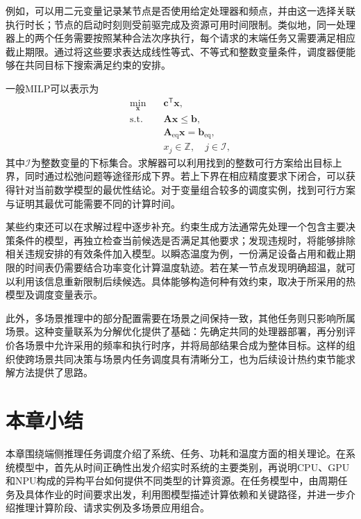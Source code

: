 例如，可以用二元变量记录某节点是否使用给定处理器和频点，并由这一选择关联执行时长；节点的启动时刻则受前驱完成及资源可用时间限制。类似地，同一处理器上的两个任务需要按照某种合法次序执行，每个请求的末端任务又需要满足相应截止期限。通过将这些要求表达成线性等式、不等式和整数变量条件，调度器便能够在共同目标下搜索满足约束的安排。

一般MILP可以表示为
\begin{equation}\label{eq:ch2-milp}
 \begin{aligned}
  \min_{\boldsymbol x}\quad &\boldsymbol c^{\mathsf T}\boldsymbol x,\\
  \text{s.t.}\quad &\boldsymbol A\boldsymbol x\le\boldsymbol b,\\
  &\boldsymbol A_{\mathrm{eq}}\boldsymbol x=\boldsymbol b_{\mathrm{eq}},\\
  &x_j\in\mathbb Z,\quad j\in\mathcal I,
 \end{aligned}
\end{equation}
其中$\mathcal I$为整数变量的下标集合。求解器可以利用找到的整数可行方案给出目标上界，同时通过松弛问题等途径形成下界。若上下界在相应精度要求下闭合，可以获得针对当前数学模型的最优性结论。对于变量组合较多的调度实例，找到可行方案与证明其最优可能需要不同的计算时间。

某些约束还可以在求解过程中逐步补充。约束生成方法通常先处理一个包含主要决策条件的模型，再独立检查当前候选是否满足其他要求；发现违规时，将能够排除相关违规安排的有效条件加入模型。以瞬态温度为例，一份满足设备占用和截止期限的时间表仍需要结合功率变化计算温度轨迹。若在某一节点发现明确超温，就可以利用该信息重新限制后续候选。具体能够构造何种有效约束，取决于所采用的热模型及调度变量表示。

此外，多场景推理中的部分配置需要在场景之间保持一致，其他任务则只影响所属场景。这种变量联系为分解优化提供了基础：先确定共同的处理器部署，再分别评价各场景中允许采用的频率和执行时序，并将局部结果合成为整体目标。这样的组织使跨场景共同决策与场景内任务调度具有清晰分工，也为后续设计热约束节能求解方法提供了思路。

\section{本章小结}

本章围绕端侧推理任务调度介绍了系统、任务、功耗和温度方面的相关理论。在系统模型中，首先从时间正确性出发介绍实时系统的主要类别，再说明CPU、GPU和NPU构成的异构平台如何提供不同类型的计算资源。在任务模型中，由周期任务及具体作业的时间要求出发，利用图模型描述计算依赖和关键路径，并进一步介绍推理计算阶段、请求实例及多场景应用组合。

